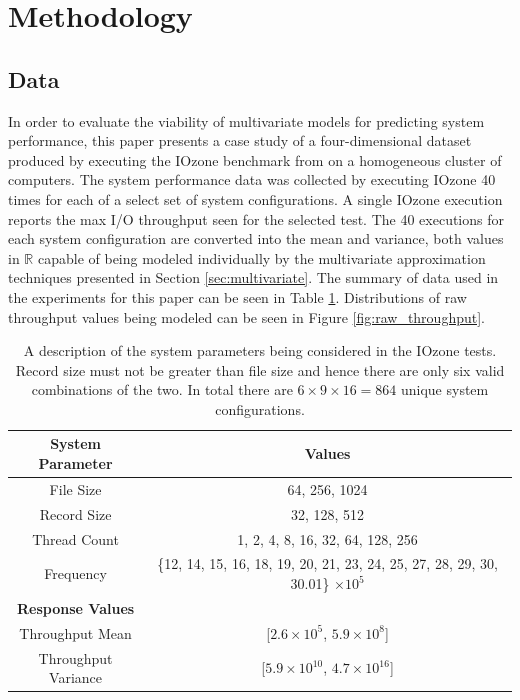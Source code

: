 \documentclass{scspaperproc}
\theoremstyle{scsthe}
\begin{document}
\section{Methodology}
\label{sec:methodology}
\subsection{Data}
\vspace{-10pt}
In order to evaluate the viability of multivariate models for
predicting system performance, this paper presents a case study of a
four-dimensional dataset produced by executing the IOzone benchmark
from  on a homogeneous cluster of computers. The
system performance data was collected by executing IOzone 40 times for
each of a select set of system configurations. A single IOzone
execution reports the max I/O throughput seen for the selected
test. The 40 executions for each system configuration are converted
into the mean and variance, both values in $\mathbb{R}$ capable of
being modeled individually by the multivariate approximation
techniques presented in Section \ref{sec:multivariate}. The summary of
data used in the experiments for this paper can be seen in Table
\ref{tab:data_type}.  Distributions of raw throughput values being
modeled can be seen in Figure \ref{fig:raw_throughput}.

\begin{table}
  \centering
  \begin{tabular}{c|c}
    \hline
    \textbf{System Parameter} & \textbf{Values}\\
    \hline
    File Size & 64, 256, 1024\\
    Record Size & 32, 128, 512\\
    Thread Count & 1, 2, 4, 8, 16, 32, 64, 128, 256\\
    Frequency & \{12, 14, 15, 16, 18, 19, 20, 21, 23, 24, 25, 27, 28, 29, 30, 30.01\} $\times 10^5$\\
    \hline
    \textbf{Response Values} & \\
    \hline
    Throughput Mean & [$2.6 \times 10^5$, $5.9 \times 10^8$]\\
    Throughput Variance & [$5.9\times 10^{10} $, $4.7 \times 10^{16}$]\\
    \hline
  \end{tabular}
  \caption{A description of the system parameters being considered in
    the IOzone tests. Record size must not be greater than file size
    and hence there are only six valid combinations of the two. In
    total there are $6 \times 9 \times 16 = 864$ unique system
    configurations.}
  \label{tab:data_type}
\end{table}
\end{document}
